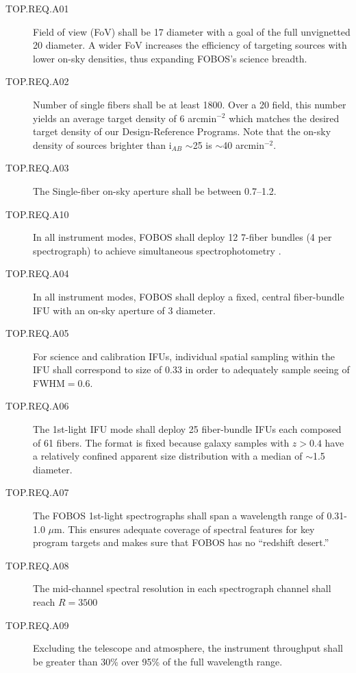 \documentclass[11pt,a4paper,twoside,onecolumn,openany,final,oldfontcommands]{memoir}
\begin{document}
\begin{description}

\item [TOP.REQ.A01] Field of view (FoV) shall be 17\arcmin{} diameter with a goal of the full unvignetted 20\arcmin{} diameter.  A wider FoV increases the efficiency of targeting sources with lower on-sky densities, thus expanding FOBOS's science breadth.

\item [TOP.REQ.A02] Number of single fibers shall be at least 1800.  Over a 20\arcmin{} field, this number yields an average target density of 6 arcmin$^{-2}$ which matches the desired target density of our Design-Reference Programs.  Note that the on-sky density of sources brighter than i$_{AB}$ $\sim$25 is $\sim$40 arcmin$^{-2}$.

\item [TOP.REQ.A03] The Single-fiber on-sky aperture shall be between 0.7--1.2\arcsec{}.

\item [TOP.REQ.A10] In all instrument modes, FOBOS shall deploy 12 7-fiber bundles (4 per spectrograph) to achieve simultaneous spectrophotometry \citep[see][]{yan16}.  

\item [TOP.REQ.A04] In all instrument modes, FOBOS shall deploy a fixed, central fiber-bundle IFU with an on-sky aperture of 3\arcsec{} diameter.

\item [TOP.REQ.A05] For science and calibration IFUs, individual spatial sampling within the IFU shall correspond to size of 0.33\arcsec{} in order to adequately sample seeing of FWHM$ = 0.6$\arcsec.

\item [TOP.REQ.A06] The 1st-light IFU mode shall deploy 25 fiber-bundle IFUs each composed of 61 fibers.  The format is fixed because galaxy samples with $z > 0.4$ have a relatively confined apparent size distribution with a median of  $\sim$1.5\arcsec{} diameter.

\item [TOP.REQ.A07] The FOBOS 1st-light spectrographs shall span a wavelength range of 0.31-1.0 $\mu$m.  This ensures adequate coverage of spectral features for key program targets and makes sure that FOBOS has no ``redshift desert.''

\item [TOP.REQ.A08] The mid-channel spectral resolution in each spectrograph channel shall reach $R = 3500$

\item [TOP.REQ.A09] Excluding the telescope and atmosphere, the instrument throughput shall be greater than 30\% over 95\% of the full wavelength range.

\end{description}
\end{document}

